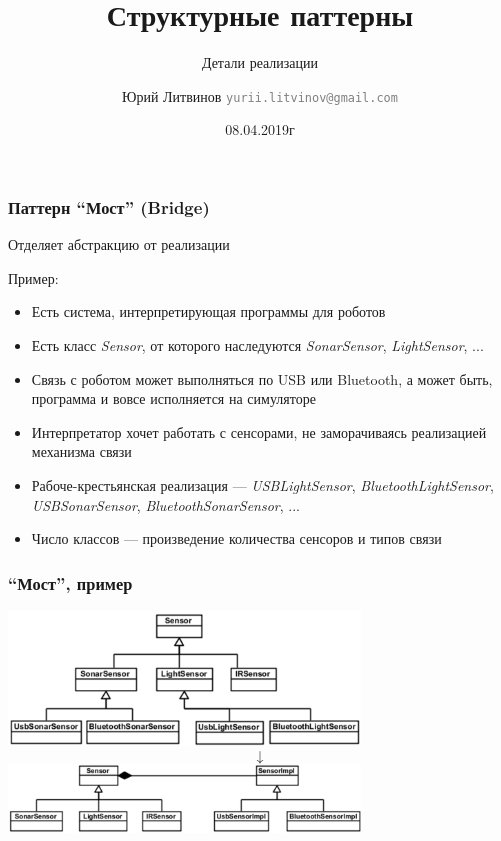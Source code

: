 \documentclass[xetex,mathserif,serif]{beamer}
\title{Структурные паттерны}
\subtitle{Детали реализации}
\author[Юрий Литвинов]{Юрий Литвинов \newline \textcolor{gray}{\small\texttt{yurii.litvinov@gmail.com}}}
\date{08.04.2019г}
\begin{document}
	
	\frame{\titlepage}

	\begin{frame}
		\frametitle{Паттерн ``Мост'' (Bridge)}
		Отделяет абстракцию от реализации

		Пример:
		\begin{itemize}
			\item Есть система, интерпретирующая программы для роботов
			\item Есть класс \textit{Sensor}, от которого наследуются \textit{SonarSensor}, \textit{LightSensor}, ...
			\item Связь с роботом может выполняться по USB или Bluetooth, а может быть, программа и вовсе исполняется на симуляторе
			\item Интерпретатор хочет работать с сенсорами, не заморачиваясь реализацией механизма связи
			\item Рабоче-крестьянская реализация --- \textit{USBLightSensor}, \textit{BluetoothLightSensor}, \textit{USBSonarSensor}, \textit{BluetoothSonarSensor}, ...
			\item Число классов --- произведение количества сенсоров и типов связи
		\end{itemize}
	\end{frame}

	\begin{frame}
		\frametitle{``Мост'', пример}
		\begin{center}
			\includegraphics[width=0.7\textwidth]{noBridge.png}
			\Huge{$$\downarrow$$}
			\includegraphics[width=0.7\textwidth]{bridge.png}
		\end{center}
	\end{frame}
\end{document}

